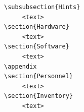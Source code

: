 \documentclass[11pt,twoside]{article}
\begin{document}
\begin{verbatim}
\subsubsection{Hints}
     <text>
\section{Hardware}
     <text>
\section{Software}
     <text>
\appendix
\section{Personnel}
     <text>
\section{Inventory}
     <text>
\end{verbatim}

\newpage
\end{document}
